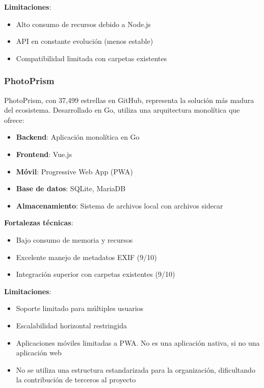 \textbf{Limitaciones}:
\begin{itemize}
    \item Alto consumo de recursos debido a Node.js
    \item API en constante evolución (menos estable)
    \item Compatibilidad limitada con carpetas existentes
\end{itemize}

\subsubsection{PhotoPrism}

PhotoPrism, con 37,499 estrellas en GitHub, representa la solución más madura del ecosistema. Desarrollado en Go, utiliza una arquitectura monolítica que ofrece:

\begin{itemize}
    \item \textbf{Backend}: Aplicación monolítica en Go
    \item \textbf{Frontend}: Vue.js
    \item \textbf{Móvil}: Progressive Web App (PWA)
    \item \textbf{Base de datos}: SQLite, MariaDB
    \item \textbf{Almacenamiento}: Sistema de archivos local con archivos sidecar
\end{itemize}

\textbf{Fortalezas técnicas}:
\begin{itemize}
    \item Bajo consumo de memoria y recursos
    \item Excelente manejo de metadatos EXIF (9/10)
    \item Integración superior con carpetas existentes (9/10)
\end{itemize}

\textbf{Limitaciones}:
\begin{itemize}
    \item Soporte limitado para múltiples usuarios
    \item Escalabilidad horizontal restringida
    \item Aplicaciones móviles limitadas a PWA. No es una aplicación nativa, si no una aplicación web
    \item No se utiliza una estructura estandarizada para la organización, dificultando la contribución de terceros al proyecto
\end{itemize}

